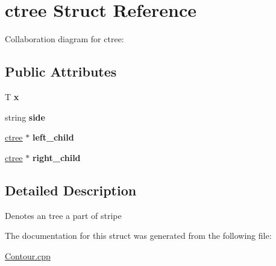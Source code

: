 \hypertarget{structctree}{}\section{ctree Struct Reference}
\label{structctree}


Collaboration diagram for ctree\+:
\subsection*{Public Attributes}
\begin{DoxyCompactItemize}
\item 
\mbox{\label{structctree_ad0c887482b4a9d9c81288dbb80fc4eb3}} 
T {\bfseries x}
\item 
\mbox{\label{structctree_ab75c843f9c711d09577764a0b9ca32bc}} 
string {\bfseries side}
\item 
\mbox{\label{structctree_a216ef7347d47776b6ac4a9fed59294c3}} 
\hyperlink{structctree}{ctree} $\ast$ {\bfseries left\+\_\+child}
\item 
\mbox{\label{structctree_ac71485dd052a0166db8da4277616bf50}} 
\hyperlink{structctree}{ctree} $\ast$ {\bfseries right\+\_\+child}
\end{DoxyCompactItemize}


\subsection{Detailed Description}
Denotes an tree a part of stripe 

The documentation for this struct was generated from the following file\+:\begin{DoxyCompactItemize}
\item 
\hyperlink{Contour_8cpp}{Contour.\+cpp}\end{DoxyCompactItemize}
